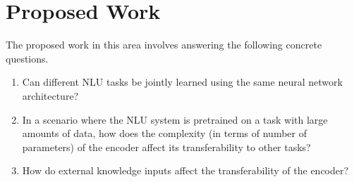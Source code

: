 \section{Proposed Work}
The proposed work in this area involves answering the following concrete questions.
\begin{enumerate}
 \item Can different NLU tasks be jointly learned using the same neural network architecture?
 \item In a scenario where the NLU system is pretrained on a task with large amounts of data, how does the complexity (in terms of number of parameters)
 of the encoder affect its transferability to other tasks?
 \item How do external knowledge inputs affect the transferability of the encoder?
\end{enumerate}
